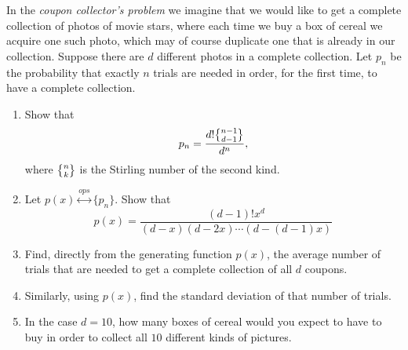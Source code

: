 \begin{exercise}
    In the \emph{coupon collector's problem} we imagine that we would like to get a complete collection of photos of movie stars, where each time we buy a box of cereal we acquire one such photo, which may of course duplicate one that is already in our collection. Suppose there are $d$ different photos in a complete collection. Let $p_n$ be the probability that exactly $n$ trials are needed in order, for the first time, to have a complete collection.
    \begin{enumerate}[label=(\alph*)]
        \item Show that
        \[
            p_n = \frac{d!\stirlingSnd{n-1}{d-1}}{d^n},
        \]
        where $\stirlingSnd{n}{k}$ is the Stirling number of the second kind.
        \item Let $p(x) \stackrel{ops}{\longleftrightarrow} \{p_n\}$. Show that 
        \[
            p(x) = \frac{(d-1)!x^d}{(d-x)(d-2x)\cdots(d-(d-1)x)}
        \]
        \item Find, directly from the generating function $p(x)$, the average number of trials that are needed to get a complete collection of all $d$ coupons.
        \item Similarly, using $p(x)$, find the standard deviation of that number of trials.
        \item In the case $d=10$, how many boxes of cereal would you expect to have to buy in order to collect all $10$ different kinds of pictures.
    \end{enumerate}
\end{exercise}
